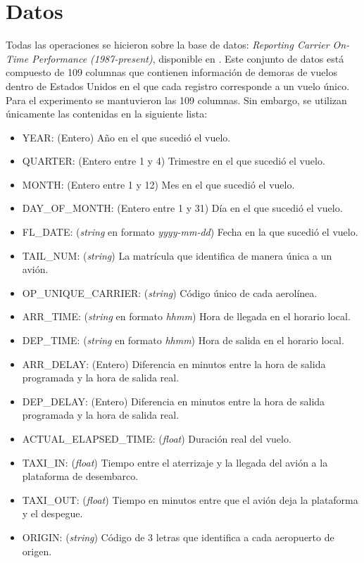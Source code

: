 \section{Datos}

Todas las operaciones se hicieron sobre la base de datos: 
\textit{Reporting Carrier On-Time Performance (1987-present)}, disponible en \cite{linktranstat}. Este conjunto de datos está compuesto de 109 columnas que contienen información de demoras de vuelos dentro de Estados Unidos en el que cada registro corresponde a un vuelo único. Para el experimento se mantuvieron las 109 columnas. Sin embargo, se utilizan únicamente las contenidas en la siguiente lista:

\begin{itemize}
	\item YEAR: (Entero) Año en el que sucedió el vuelo.
	\item QUARTER: (Entero entre 1 y 4) Trimestre en el que sucedió el vuelo.
	\item MONTH: (Entero entre 1 y 12) Mes en el que sucedió el vuelo.
	\item DAY\_OF\_MONTH: (Entero entre 1 y 31) Día en el que sucedió el vuelo.
	\item FL\_DATE: (\textit{string} en formato \textit{yyyy-mm-dd}) Fecha en la que sucedió el vuelo.
	\item TAIL\_NUM: (\textit{string}) La matrícula que identifica de manera única a un avión.
	\item OP\_UNIQUE\_CARRIER: (\textit{string}) Código único de cada aerolínea.
	\item ARR\_TIME: (\textit{string} en formato \textit{hhmm}) Hora de llegada en el horario local.
	\item DEP\_TIME: (\textit{string} en formato \textit{hhmm}) Hora de salida en el horario local.
	\item ARR\_DELAY: (Entero) Diferencia en minutos entre la hora de salida programada y la hora de salida real.
	\item DEP\_DELAY: (Entero) Diferencia en minutos entre la hora de salida programada y la hora de salida real.
	\item ACTUAL\_ELAPSED\_TIME: (\textit{float}) Duración real del vuelo.
	\item TAXI\_IN: (\textit{float}) Tiempo entre el aterrizaje y la llegada del avión a la plataforma de desembarco.
	\item TAXI\_OUT: (\textit{float}) Tiempo en minutos entre que el avión deja la plataforma y el despegue.
	\item ORIGIN: (\textit{string}) Código de 3 letras que identifica a cada aeropuerto de origen.

\end{itemize}
